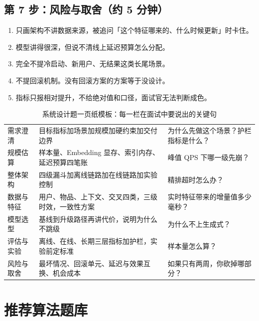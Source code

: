 \subsection{第 7 步：风险与取舍（约 5 分钟）}

\begin{pitfall}[系统设计题最常见的五个失分点]
\begin{enumerate}
  \item 只画架构不讲数据来源，被追问「这个特征哪来的、什么时候更新」时卡住。
  \item 模型讲得很深，但说不清线上延迟预算怎么分配。
  \item 完全不提冷启动、新用户、无结果这类长尾场景。
  \item 不提回滚机制。没有回滚方案的方案等于没设计。
  \item 指标只报相对提升，不给绝对值和口径，面试官无法判断成色。
\end{enumerate}
\end{pitfall}

\begin{table}[htbp]
\centering
\caption{系统设计题一页纸模板：每一栏在面试中要说出的关键句}
\label{tab:interview-template}
\small
\begin{tabularx}{\textwidth}{L{2.2cm} L{5.2cm} Y}
\toprule
{} &  &  \\
\midrule
需求澄清 & 目标指标加场景加规模加硬约束加交付边界 & 为什么先做这个场景？护栏指标是什么？ \\
规模估算 & 样本量、Embedding 显存、索引内存、延迟预算四笔账 & 峰值 QPS 下哪一级先崩？ \\
整体架构 & 四级漏斗加离线链路加在线链路加实验控制 & 精排超时怎么办？ \\
数据与特征 & 用户、物品、上下文、交叉四类，三级时效，一致性方案 & 实时特征带来的增量值多少毫秒？ \\
模型选型 & 基线到升级路径再讲代价，说明为什么不跳级 & 为什么不上生成式？ \\
评估与实验 & 离线、在线、长期三层指标加护栏，实验前定标准 & 样本量怎么算？ \\
风险与取舍 & 最坏情况、回滚单元、延迟与效果互换、机会成本 & 如果只有两周，你砍掉哪部分？ \\
\bottomrule
\end{tabularx}
\end{table}

\section{推荐算法题库}

